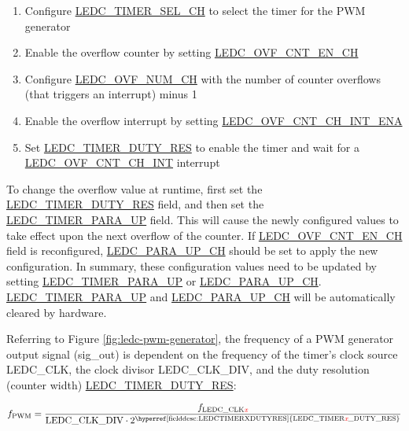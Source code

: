 \documentclass[main\_\_EN.tex]{subfiles}
\begin{document}
 \begin{enumerate}
    \item Configure \hyperref[fielddesc:LEDCTIMERSELCHN]{LEDC\_TIMER\_SEL\_CH} to select the timer for the PWM generator
    \item Enable the overflow counter by setting  \hyperref[fielddesc:LEDCOVFCNTENCHN]{LEDC\_OVF\_CNT\_EN\_CH}
    \item Configure
    \hyperref[fielddesc:LEDCOVFNUMCHN]{LEDC\_OVF\_NUM\_CH} with the number of counter overflows (that triggers an interrupt) minus 1
    \item Enable the overflow interrupt by setting \hyperref[fielddesc:LEDCOVFCNTCHNINTENA]{LEDC\_OVF\_CNT\_CH\_INT\_ENA}
    \item Set \hyperref[fielddesc:LEDCTIMERXDUTYRES]{LEDC\_TIMER\_DUTY\_RES} to enable the timer and
    wait for a \hyperref[int:ledc-ovf-cnt]{LEDC\_OVF\_CNT\_CH\_INT} interrupt
\end{enumerate}

To change the overflow value at runtime, first set the \hyperref[fielddesc:LEDCTIMERXDUTYRES]{LEDC\_TIMER\_DUTY\_RES} field, and then set the\\ \hyperref[fielddesc:LEDCTIMERXPARAUP]{LEDC\_TIMER\_PARA\_UP} field. This will cause the newly configured values to take effect upon the next overflow of the counter. If \hyperref[fielddesc:LEDCOVFCNTENCHN]{LEDC\_OVF\_CNT\_EN\_CH} field is reconfigured, \hyperref[fielddesc:LEDCPARAUPCHN]{LEDC\_PARA\_UP\_CH} should be set to apply the new configuration. In summary, these configuration values need to be updated by setting \hyperref[fielddesc:LEDCTIMERXPARAUP]{LEDC\_TIMER\_PARA\_UP} or \hyperref[fielddesc:LEDCPARAUPCHN]{LEDC\_PARA\_UP\_CH}. \hyperref[fielddesc:LEDCTIMERXPARAUP]{LEDC\_TIMER\_PARA\_UP} and \hyperref[fielddesc:LEDCPARAUPCHN]{LEDC\_PARA\_UP\_CH} will be automatically cleared by hardware.


Referring to Figure \ref{fig:ledc-pwm-generator}, the frequency of a PWM generator output signal (sig\_out) is dependent on the frequency of the timer’s clock source LEDC\_CLK, the clock divisor LEDC\_CLK\_DIV, and the duty resolution (counter width) \hyperref[fielddesc:LEDCTIMERXDUTYRES]{LEDC\_TIMER\_DUTY\_RES}:

    \[
    f_{\textrm{PWM}}=\frac{f_{\textrm{LEDC\_CLK\regindex{x}}}}
                        {\textrm{LEDC\_CLK\_DIV}\cdot 2^{\textrm{\hyperref[fielddesc:LEDCTIMERXDUTYRES]{LEDC\_TIMER\regindex{x}\_DUTY\_RES}}}}
    \]
\end{document}
